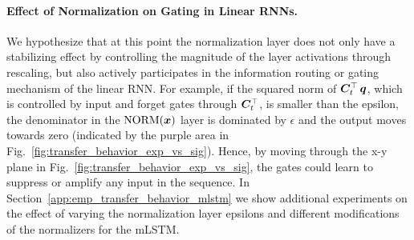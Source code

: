 \documentclass{article}
\begin{document}
\paragraph{Effect of Normalization on Gating in Linear RNNs.}
We hypothesize that at this point the normalization layer does not only have a stabilizing effect by controlling the magnitude of the layer activations through rescaling, but also actively participates in the information routing or gating mechanism of the linear RNN.
For example, if the squared norm of $\bm{C}_t^\top \, \bm{q}$, which is controlled by input and forget gates through $\bm{C}_t^\top$, is smaller than the epsilon, the denominator in the $\mathrm{NORM}(\bm{x})$ layer is dominated by $\epsilon$ and the output moves towards zero (indicated by the purple area in Fig.~\ref{fig:transfer_behavior_exp_vs_sig}).
Hence, by moving through the x-y plane in Fig.~\ref{fig:transfer_behavior_exp_vs_sig}, the gates could learn to suppress or amplify any input in the sequence.
In Section~\ref{app:emp_transfer_behavior_mlstm} we show additional experiments on the effect of varying the normalization layer epsilons and different modifications of the normalizers for the mLSTM.

\vspace{-0.15cm}
\end{document}
